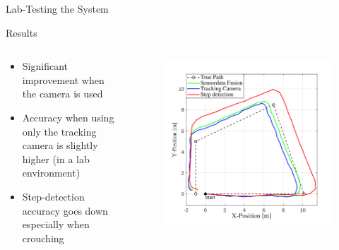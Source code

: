 \documentclass[aspectratio=169]{beamer}
\begin{document}
{\begin{frame}{Lab-Testing the System}
	\end{frame}
	
	\begin{frame}{Results}
		\begin{columns}
			\begin{column}{0.45\textwidth}
				\begin{itemize}
					\item Significant improvement when the camera is used
					\item Accuracy when using only the tracking camera is slightly higher (in a lab environment)
					\item Step-detection accuracy goes down especially when crouching
				\end{itemize}
				
			\end{column}
			\begin{column}{0.54\textwidth}
				\begin{figure}
					\centering
					\includegraphics[width=0.9\linewidth]{../Conference_Paper/Path2}
					\caption{}
					\label{fig:path}
				\end{figure}
			\end{column}
					
			
		\end{columns}
	\end{frame}
	
}
\end{document}

